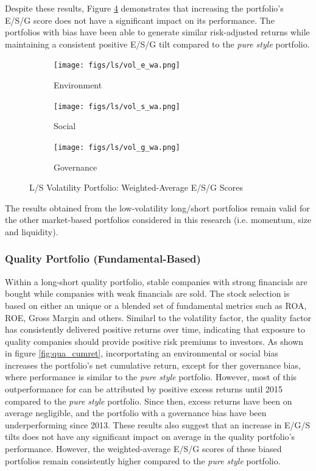 \documentclass[11pt,a4paper]{article}
\begin{document}
Despite these results, Figure \ref{fig:vol_esg_wa} demonstrates that increasing the portfolio's E/S/G score does not have a significant impact on its performance. 
The portfolios with bias have been able to generate similar risk-adjusted returns while maintaining a consistent positive E/S/G tilt compared to the \textit{pure style} portfolio.

\begin{figure}[h!]
    \centering
    \begin{subfigure}{.33\textwidth}
        \centering
        \texttt{[image: figs/ls/vol\_e\_wa.png]}
        \caption{Environment}
        \label{fig:vol_e_wa}
    \end{subfigure}%
    \begin{subfigure}{.33\textwidth}
      \centering
      \texttt{[image: figs/ls/vol\_s\_wa.png]}
      \caption{Social}
      \label{fig:vol_s_wa}
    \end{subfigure}%
    \begin{subfigure}{.33\textwidth}
        \centering
        \texttt{[image: figs/ls/vol\_g\_wa.png]}
        \caption{Governance}
        \label{fig:vol_g_wa}
      \end{subfigure}
    \caption{L/S Volatility Portfolio: Weighted-Average E/S/G Scores}
    \label{fig:vol_esg_wa}
\end{figure}

The results obtained from the low-volatility long/short portfolios remain valid for the other market-based portfolios considered in this research (i.e. momentum, size and liquidity). 

\subsubsection{Quality Portfolio (Fundamental-Based)}

Within a long-short quality portfolio, stable companies with strong financials are bought while companies with weak financials are sold. The stock selection is based on either an unique or a blended set of fundamental metrics such as ROA, ROE, Gross Margin and others.
Similarl to the volatility factor, the quality factor has consistently delivered positive returns over time, indicating that exposure to quality companies should provide positive risk premiums to investors.
As shown in figure \ref{fig:qua_cumret}, incorportating an environmental or social bias increases the portfolio's net cumulative return, except for ther governance bias, where performance is similar to the \textit{pure style} portfolio. 
However, most of this outperformance for can be attributed by positive excess returns until 2015 compared to the \textit{pure style} portfolio. 
Since then, excess returns have been on average negligible, and the portfolio with a governance bias have been underperforming since 2013. 
These results also suggest that an increase in E/G/S tilts does not have any significant impact on average in the quality portfolio's performance. 
However, the weighted-average E/S/G scores of these biased portfolios remain consistently higher compared to the \textit{pure style} portfolio.
\end{document}

